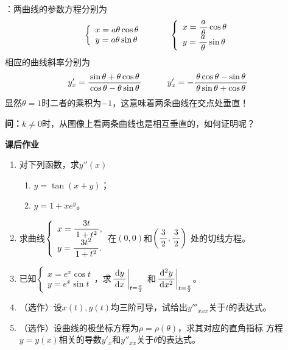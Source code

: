 \begin{shaded}
	[提示]：两曲线的参数方程分别为
	$$
	\left\{\begin{array}{l}
		x=a\theta\cos\theta\\
		y=a\theta\sin\theta
	\end{array}\right.
	\quad\quad\quad
	\left\{\begin{array}{l}
		x=\displaystyle\frac{\,{a}\,}{\,{\theta}\,}\cos\theta\\
		y=\displaystyle\frac{\,{a}\,}{\,{\theta}\,}\sin\theta
	\end{array}\right.
	$$
	相应的曲线斜率分别为
	$$y'_x=\displaystyle\frac{\,{\sin\theta+\theta\cos\theta}\,}{\,{\cos\theta-\theta\sin\theta}\,}
	\quad\quad\quad
	y'_x=-\displaystyle\frac{\,{\theta\cos\theta-\sin\theta}\,}{\,{\theta\sin\theta+\cos\theta}\,}
	$$
	显然$\theta=1$时二者的乘积为$-1$，这意味着两条曲线在交点处垂直！
	
	{\bf 问：}$k\ne0$时，从图像上看两条曲线也是相互垂直的，如何证明呢？
\end{shaded}

\begin{ext}
	{\centering\bf 课后作业}
	
	\begin{enumerate}  
	  \item 对下列函数，求$y''(x)$
	  \begin{enumerate}[(1)]
	    \item $y=\tan(x+y)$；
	    \item $y=1+xe^y$。
	  \end{enumerate}
	  \item 求曲线$\left\{\begin{array}{l}
	  	x=\displaystyle\frac{\,{3t}\,}{\,{1+t^2}\,},\\ y=\displaystyle\frac{\,{3t^2}\,}{\,{1+t^2}\,}.
	  \end{array}\right.$在$(0,0)$和$\left(\displaystyle\frac{\,{3}\,}{\,{2}\,},\displaystyle\frac{\,{3}\,}{\,{2}\,}\right)$
	  处的切线方程。
	  \item 已知$\left\{\begin{array}{l}
	  	x=e^x\cos t\\ y=e^x\sin t
	  \end{array}\right.$，求$\left.\displaystyle\frac{\,{\mathrm{d} y}\,}{\,{\mathrm{d} x}\,}\right|_{t=\frac{\pi}2}$
	  和$\left.\displaystyle\frac{\,{\mathrm{d}^2 y}\,}{\,{\mathrm{d} x^2}\,}\right|_{t=\frac{\pi}2}$。
	  \item （选作）设$x(t),y(t)$均三阶可导，试给出$y'''_{xxx}$关于$t$的表达式。
	  \item （选作）设曲线的极坐标方程为$\rho=\rho(\theta)$，求其对应的直角指标
	  方程$y=y(x)$相关的导数$y'_x$和$y''_{xx}$关于$\theta$的表达式。
	\end{enumerate}
\end{ext}

